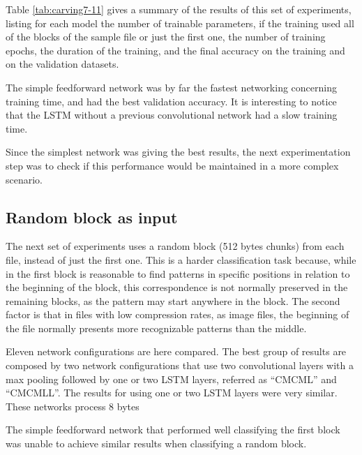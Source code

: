 Table \ref{tab:carving7-11} gives a summary of the results of this set of experiments, listing for each model the number of trainable parameters, if the training used all of the blocks of the sample file or just the first one, the number of training epochs, the duration of the training, and the final accuracy on the training and on the validation datasets.


The simple feedforward network was by far the fastest networking concerning training time, and had the best validation accuracy. It is interesting to notice that the LSTM without a previous convolutional network had a slow training time.

Since the simplest network was giving the best results, the next experimentation step was to check if this performance would be maintained in a more complex scenario.

\subsection{Random block as input}

The next set of experiments uses a random block (512 bytes chunks) from each file, instead of just the first one. This is a harder classification task because, while in the first block is reasonable to find patterns in specific positions in relation to the beginning of the block, this correspondence is not normally preserved in the remaining blocks, as the pattern may start anywhere in the block. The second factor is that in files with low compression rates, as image files, the beginning of the file normally presents more recognizable patterns than the middle.

Eleven network configurations are here compared.
The best group of results are composed by two network configurations that use two convolutional layers with a max pooling followed by one or two LSTM layers, referred as ``CMCML'' and  ``CMCMLL''. The results for using one or two LSTM layers were very similar. These networks process 8 bytes

The simple feedforward network that performed well classifying the first block was unable to achieve similar results when classifying a random block.

